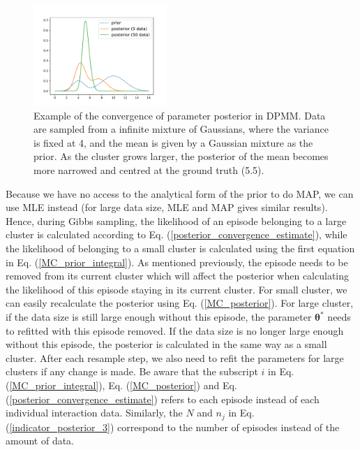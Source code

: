 \begin{figure}[h]
\centering
\includegraphics[width=0.45\textwidth]{posterior_convergence.pdf}
\caption{Example of the convergence of parameter posterior in DPMM.
Data are sampled from a infinite mixture of Gaussians, where the variance is fixed at 4, and the mean is given by a Gaussian mixture as the prior.
As the cluster grows larger, the posterior of the mean becomes more narrowed and centred at the ground truth (5.5).
}
\label{posterior_convergence}
\end{figure}

Because we have no access to the analytical form of the prior to do MAP, we can use MLE instead (for large data size, MLE and MAP gives similar results).
Hence, during Gibbs sampling, the likelihood of an episode belonging to a large cluster is calculated according to Eq. (\ref{posterior_convergence_estimate}), while the likelihood of belonging to a small cluster is calculated using the first equation in Eq. (\ref{MC_prior_integral}).
As mentioned previously, the episode needs to be removed from its current cluster which will affect the posterior when calculating the likelihood of this episode staying in its current cluster.
For small cluster, we can easily recalculate the posterior using Eq. (\ref{MC_posterior}).
For large cluster, if the data size is still large enough without this episode, the parameter $\bm{\theta}^*$ needs to refitted with this episode removed.
If the data size is no longer large enough without this episode, the posterior is calculated in the same way as a small cluster.
After each resample step, we also need to refit the parameters for large clusters if any change is made.
Be aware that the subscript $i$ in Eq. (\ref{MC_prior_integral}), Eq. (\ref{MC_posterior}) and Eq. (\ref{posterior_convergence_estimate}) refers to each episode instead of each individual interaction data. 
Similarly, the $N$ and $n_j$ in Eq. (\ref{indicator_posterior_3}) correspond to the number of episodes instead of the amount of data.


